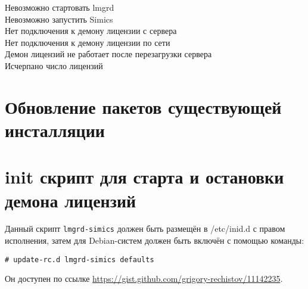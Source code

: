 \begin{description}
    \item[Невозможно стартовать lmgrd]
    
    \item[Невозможно запустить Simics]
    
    \item[Нет подключения к демону лицензии с сервера]

    
    \item[Нет подключения к демону лицензии по сети] 
    
    \item[Демон лицензий не работает после перезагрузки сервера] 
    
    
    \item[Исчерпано число лицензий]
    
\end{description}

\section{Обновление пакетов существующей инсталляции}

\todo

\section{init скрипт для старта и остановки демона лицензий}
Данный скрипт \texttt{lmgrd-simics} должен быть размещён в /etc/inid.d с правом исполнения, затем для Debian-систем должен быть включён с помощью команды:

\texttt{\# update-rc.d lmgrd-simics defaults}

Он доступен по ссылке \url{https://gist.github.com/grigory-rechistov/11142235}.

